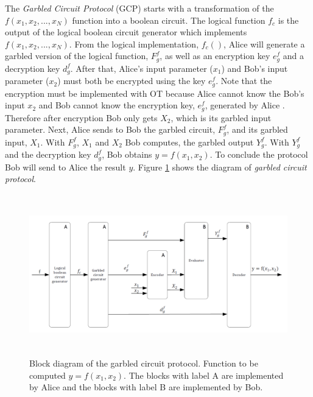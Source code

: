 \begin{refsection}
The \textit{Garbled Circuit Protocol} (GCP) starts with a transformation of the $f(x_1,x_2,...,x_N)$ function into a boolean circuit. The logical function $f_c$ is the output of the logical boolean circuit generator which implements $f(x_1,x_2,...,x_N)$. From the logical implementation, $f_c( )$, Alice will generate a garbled version of the logical function, $F_g^f$, as well as an encryption key $e_g^f$ and a decryption key $d_g^f$. After that, Alice's input parameter ($x_1$) and Bob's input parameter ($x_2$) must both be encrypted using the key $e_g^f$. Note that the encryption must be implemented with OT because Alice cannot know the Bob's input $x_2$ and Bob cannot know the encryption key, $e_g^f$, generated by Alice \cite{Naumann16}. Therefore after encryption Bob only gets $X_2$, which is its garbled input parameter. Next, Alice sends to Bob the garbled circuit, $F_g^f$, and its garbled input, $X_1$. With $F_g^f$, $X_1$ and $X_2$ Bob computes, the garbled output $Y_g^f$. With $Y_g^f$ and the decryption key $d_g^f$, Bob obtains $y=f(x_1,x_2)$. To conclude the protocol Bob will send to Alice the result $y$. Figure \ref{fig:garbledcircuit} shows the diagram of \textit{garbled circuit protocol}.

\begin{figure}[H]
	\centering
	\includegraphics[width=1\textwidth, height=7cm]{./sdf/secure_multiparty_computation/figures/garbled_circuit.png}
    \caption{Block diagram of the garbled circuit protocol. Function to be computed $y=f(x_1, x_2)$. The blocks with label A are implemented by Alice and the blocks with label B are implemented by Bob.}\label{fig:garbledcircuit}
\end{figure}


\begin{table}[H]
\centering


\end{table}
\end{refsection}
